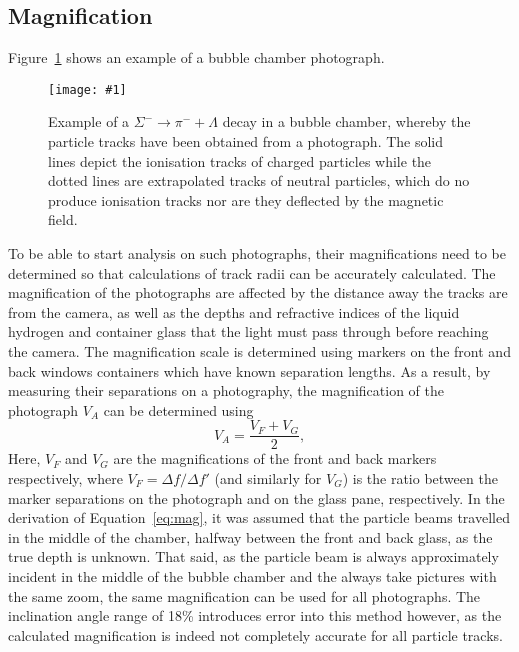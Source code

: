 \documentclass[twocolumn]{article}
\newcommand{\insertFigure}[1]{%
   \texttt{[image: \#1]}%
}
\begin{document}
\subsection{Magnification} \label{sec:mag}
Figure~\ref{fig:track} shows an example of a bubble chamber photograph.
\begin{figure}[!h]
	\centering
	\insertFigure{track.png}
	\caption{Example of a $\Sigma^- \to \pi^- + \Lambda$ decay in a bubble chamber, whereby the particle tracks have been obtained from a photograph. The solid lines depict the ionisation tracks of charged particles while the dotted lines are extrapolated tracks of neutral particles, which do no produce ionisation tracks nor are they deflected by the magnetic field.~\cite{perkins}}
	\label{fig:track}
\end{figure}
To be able to start analysis on such photographs, their magnifications need to be determined so that calculations of track radii can be accurately calculated. The magnification of the photographs are affected by the distance away the tracks are from the camera, as well as the depths and refractive indices of the liquid hydrogen and container glass that the light must pass through before reaching the camera. The magnification scale is determined using markers on the front and back windows containers which have known separation lengths. As a result, by measuring their separations on a photography, the magnification of the photograph $V_A$ can be determined using~\cite{seul}
\begin{equation} \label{eq:mag}
V_A = \frac {V_F+V_G} {2},
\end{equation}
Here, $V_F$ and $V_G$ are the magnifications of the front and back markers respectively, where $V_F = \Delta f/ \Delta f'$ (and similarly for $V_G$) is the ratio between the marker separations on the photograph and on the glass pane, respectively. In the derivation of Equation~\ref{eq:mag}, it was assumed that the particle beams travelled in the middle of the chamber, halfway between the front and back glass, as the true depth is unknown. That said, as the particle beam is always approximately incident in the middle of the bubble chamber and the always take pictures with the same zoom, the same magnification can be used for all photographs. The inclination angle range of 18\% introduces error into this method however, as the calculated magnification is indeed not completely accurate for all particle tracks.
\end{document}

